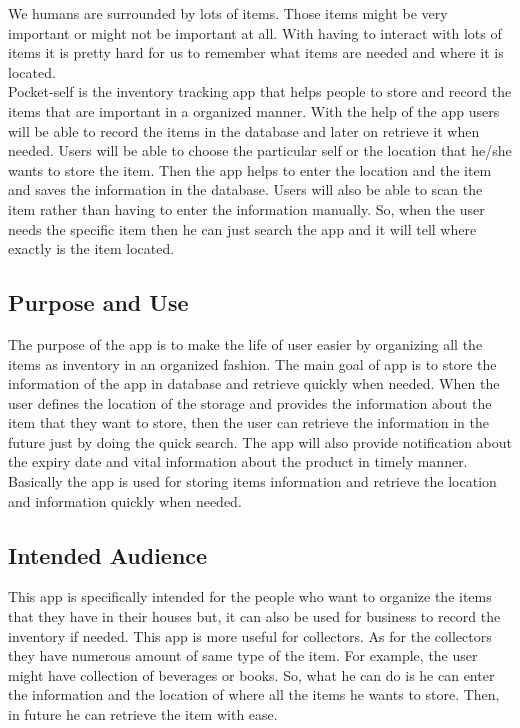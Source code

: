 We humans are surrounded by lots of items. Those items might be very important or might not be important at all. With having to interact with lots of items it is pretty hard for us to remember what items are needed and where it is located.\\
Pocket-self is the inventory tracking app that helps people to store and record the items that are important in a organized manner. With the help of the app users will be able to record the items in the database and later on retrieve it when needed. Users will be able to choose the particular self or the location that he/she wants to store the item. Then the app helps to enter the location and the item and saves the information in the database. Users will also be able to scan the item rather than having to enter the information manually. So, when the user needs the specific item then he can just search the app and it will tell where exactly is the item located.


\subsection{Purpose and Use}
The purpose of the app is to make the life of user easier by organizing all the items as inventory in an organized fashion. The main goal of app is to store the information of the app in database and retrieve quickly when needed. When the user defines the location of the storage and provides the information about the item that they want to store, then the user can retrieve the information in the future just by doing the quick search. The app will also provide notification about the expiry date and vital information about the product in timely manner. Basically the app is used for storing items information and retrieve the location and information quickly when needed.

\subsection{Intended Audience}
This app is specifically intended for the people who want to organize the items that they have in their houses but, it can also be used for business to record the inventory if needed. This app is more useful for collectors. As for the collectors they have numerous amount of same type of the item. For example, the user might have collection of beverages or books. So, what he can do is he can enter the information and the location of where all the items he wants to store. Then, in future he can retrieve the item with ease.


